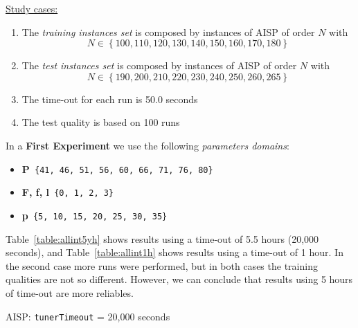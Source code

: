 \underline{Study cases:}
\begin{enumerate}
	\item The {\it training instances set} is composed by instances of AISP of order $N$ with $$N \in \left\{100, 110, 120, 130, 140, 150, 160, 170, 180\right\}$$
	\item The {\it test instances set} is composed by instances of AISP of order $N$ with $$N \in \left\{190, 200, 210, 220, 230, 240, 250, 260, 265\right\}$$
	\item The time-out for each run is 50.0 seconds
	\item The test quality is based on 100 runs
\end{enumerate}

In a {\bf First Experiment} we use the following {\it parameters domains}:
\begin{itemize}[itemsep=0.2mm]
	\item {\bf P}\texttt{ \{41, 46, 51, 56, 60, 66, 71, 76, 80\}}
	\item {\bf F, f, l}\texttt{ \{0, 1, 2, 3\}}
	\item {\bf p}\texttt{ \{5, 10, 15, 20, 25, 30, 35\}}
\end{itemize}

Table~\ref{table:allint5yh} shows results using a time-out of 5.5 hours (20,000 seconds), and Table~\ref{table:allint1h} shows results using a time-out of 1 hour. In the second case more runs were performed, but in both cases the training qualities are not so different. However, we can conclude that results using 5 hours of time-out are more reliables.

\begin{table}[h] 	
\centering 
\renewcommand{\arraystretch}{1.2}
\caption{AISP: \texttt{tunerTimeout} = 20,000 seconds}\label{table:allint5yh}
\end{table}

